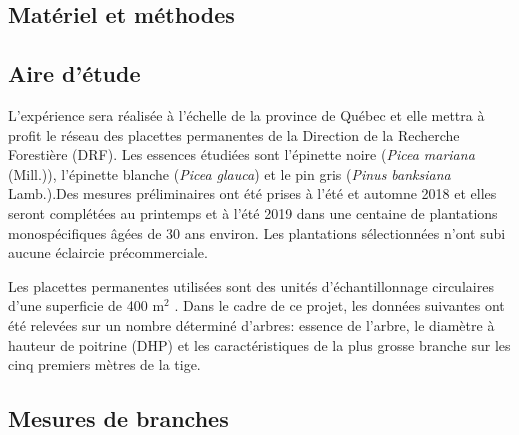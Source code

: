 \documentclass[letterpaper, 12pt]{article}
\begin{document}
\begin{onehalfspace}
\section{Matériel et méthodes} %

\subsection{Aire d'étude}

L'expérience sera réalisée à l'échelle de la province de Québec et elle mettra à profit le réseau des placettes permanentes de la Direction de la Recherche Forestière (DRF). Les essences étudiées sont l'épinette noire (\textit{Picea mariana} (Mill.)), l'épinette blanche (\textit{Picea glauca}) et le pin gris (\textit{Pinus banksiana} Lamb.).Des mesures préliminaires ont été prises à l'été et automne 2018 et elles seront complétées au printemps et à l'été 2019 dans une centaine de plantations monospécifiques âgées de 30 ans environ. Les plantations sélectionnées n'ont subi aucune éclaircie précommerciale. %

Les placettes permanentes utilisées sont des unités d'échantillonnage circulaires d'une superficie de 400 m$^{2}$ \cite{MFFP2016}. Dans le cadre de ce projet, les données suivantes ont été relevées sur un nombre déterminé %
 d'arbres: essence de l'arbre, le diamètre à hauteur de poitrine (DHP) et les caractéristiques de la plus grosse branche sur les cinq premiers mètres de la tige. 

\subsection{Mesures de branches} %


\end{onehalfspace}
\end{document}
